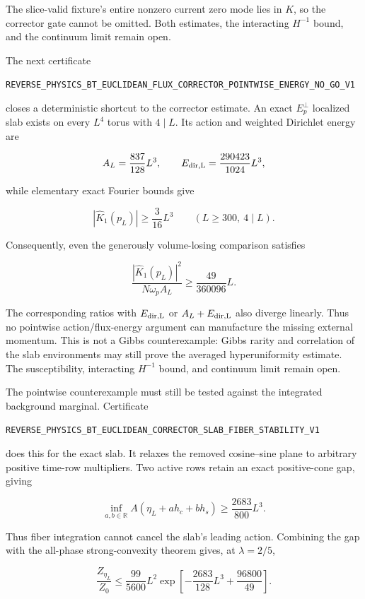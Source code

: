 \documentclass[11pt]{article}
\theoremstyle{definition}
\theoremstyle{remark}
\newcommand{\cert}[1]{\nolinkurl{#1}}
\begin{document}
The slice-valid fixture's entire nonzero current zero mode lies in \(K\), so
the corrector gate cannot be omitted.  Both estimates, the interacting
\(H^{-1}\) bound, and the continuum limit remain open.

The next certificate

\cert{REVERSE_PHYSICS_BT_EUCLIDEAN_FLUX_CORRECTOR_POINTWISE_ENERGY_NO_GO_V1}

closes a deterministic shortcut to the corrector estimate.  An exact
\(E_p^\perp\) localized slab exists on every \(L^4\) torus with \(4\mid L\).
Its action and weighted Dirichlet energy are

\[
 A_L=\frac{837}{128}L^3,
 \qquad
 E_{\rm dir,L}=\frac{290423}{1024}L^3,
\]

while elementary exact Fourier bounds give

\[
 |\widehat K_1(p_L)|\geq\frac3{16}L^3
 \qquad (L\geq300,\ 4\mid L).
\]

Consequently, even the generously volume-losing comparison satisfies

\[
 \frac{|\widehat K_1(p_L)|^2}{N\omega_pA_L}
 \geq\frac{49}{360096}L.
\]

The corresponding ratios with \(E_{\rm dir,L}\) or
\(A_L+E_{\rm dir,L}\) also diverge linearly.  Thus no pointwise
action/flux-energy argument can manufacture the missing external momentum.
This is not a Gibbs counterexample: Gibbs rarity and correlation of the slab
environments may still prove the averaged hyperuniformity estimate.  The
susceptibility, interacting \(H^{-1}\) bound, and continuum limit remain open.

The pointwise counterexample must still be tested against the integrated
background marginal.  Certificate

\cert{REVERSE_PHYSICS_BT_EUCLIDEAN_CORRECTOR_SLAB_FIBER_STABILITY_V1}

does this for the exact slab.  It relaxes the removed cosine--sine plane to
arbitrary positive time-row multipliers.  Two active rows retain an exact
positive-cone gap, giving

\[
 \inf_{a,b\in\mathbb R}A(\eta_L+a h_c+b h_s)
 \geq\frac{2683}{800}L^3.
\]

Thus fiber integration cannot cancel the slab's leading action.  Combining
the gap with the all-phase strong-convexity theorem gives, at \(\lambda=2/5\),

\[
 \frac{Z_{\eta_L}}{Z_0}
 \leq\frac{99}{5600}L^2
 \exp\left[-\frac{2683}{128}L^3+\frac{96800}{49}\right].
\]
\end{document}
